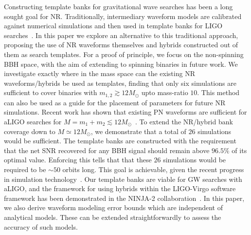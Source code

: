Constructing template banks for gravitational wave searches has
been a long sought goal for NR. Traditionally, intermediary waveform
models are calibrated against numerical simulations and then
used in template banks for LIGO searches~\cite{Abadie:2011kd,
Aasi:2012rja}. In this paper we explore an alternative to this
traditional approach, proposing the use of NR waveforms themselves
and hybrids constructed out of them as search templates.
For a proof of principle, we focus on the non-spinning BBH space, 
with the aim of extending to spinning binaries in future work. We
investigate exactly where in the mass space can the existing NR 
waveforms/hybrids be used as templates, finding that only six 
simulations are sufficient to cover binaries with 
$m_{1,2}\gtrsim 12M_\odot$ upto mass-ratio $10$. This method can
also be used as a guide for the placement of parameters for future
NR simulations. Recent work has shown that existing PN waveforms 
are sufficient for aLIGO searches for 
$M=m_1+m_2\lesssim 12M_\odot$~\cite{CompTemplates2009,Brown:2012nn}.
To extend the NR/hybrid bank coverage down to 
$M\simeq 12M_\odot$, we demonstrate that a total of $26$ 
simulations would be sufficient. The template banks are 
constructed with the requirement that the net SNR recovered for 
any BBH signal should remain above $96.5\%$ of its optimal value.
Enforcing this tells that that these $26$ simulations would be 
required to be $\sim 50$ orbits long. This goal is achievable,
given the recent progress in simulation 
technology~\cite{MacDonald:2012mp,Mroue:2013xna,BelaLongSimulation}. 
Our template banks are viable for GW searches with aLIGO, and the 
framework for using hybrids within the LIGO-Virgo software 
framework has been demonstrated in the NINJA-2
collaboration~\cite{NINJA2:2013inPrep}. In this paper, we also 
derive waveform modeling error bounds which are independent of
analytical models. These can be extended straightforwardly to 
assess the accuracy of such models.


